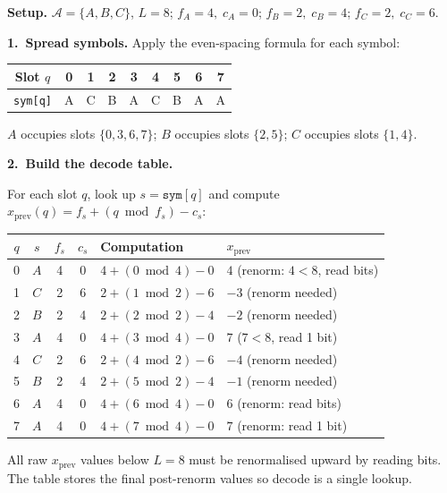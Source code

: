 \begin{examplebox}
\textbf{Setup.}
$\mathcal{A} = \{A, B, C\}$, $L = 8$;
$f_A = 4,\; c_A = 0$;\;
$f_B = 2,\; c_B = 4$;\;
$f_C = 2,\; c_C = 6$.

\medskip
\textbf{1.\ Spread symbols.}
Apply the even-spacing formula for each symbol:

\begin{center}
\begin{tabular}{@{}ccccccccc@{}}
\toprule
Slot $q$        & 0 & 1 & 2 & 3 & 4 & 5 & 6 & 7 \\
\midrule
\texttt{sym[q]} & A & C & B & A & C & B & A & A \\
\bottomrule
\end{tabular}
\end{center}

$A$ occupies slots $\{0,3,6,7\}$;\quad
$B$ occupies slots $\{2,5\}$;\quad
$C$ occupies slots $\{1,4\}$.

\medskip
\textbf{2.\ Build the decode table.}

For each slot $q$, look up $s = \texttt{sym}[q]$ and compute
$x_{\text{prev}}(q) = f_s + (q \bmod f_s) - c_s$:

\begin{center}
\begin{tabular}{@{}ccccll@{}}
\toprule
$q$ & $s$ & $f_s$ & $c_s$ & Computation & $x_{\text{prev}}$ \\
\midrule
0 & $A$ & 4 & 0 & $4+(0\bmod 4)-0$   & $4$ \quad (renorm: $4<8$, read bits) \\
1 & $C$ & 2 & 6 & $2+(1\bmod 2)-6$   & $-3$ \quad (renorm needed) \\
2 & $B$ & 2 & 4 & $2+(2\bmod 2)-4$   & $-2$ \quad (renorm needed) \\
3 & $A$ & 4 & 0 & $4+(3\bmod 4)-0$   & $7$ \quad ($7<8$, read 1 bit) \\
4 & $C$ & 2 & 6 & $2+(4\bmod 2)-6$   & $-4$ \quad (renorm needed) \\
5 & $B$ & 2 & 4 & $2+(5\bmod 2)-4$   & $-1$ \quad (renorm needed) \\
6 & $A$ & 4 & 0 & $4+(6\bmod 4)-0$   & $6$ \quad (renorm: read bits) \\
7 & $A$ & 4 & 0 & $4+(7\bmod 4)-0$   & $7$ \quad (renorm: read 1 bit) \\
\bottomrule
\end{tabular}
\end{center}

All raw $x_{\text{prev}}$ values below $L=8$ must be
renormalised upward by reading bits.  The table stores the
final post-renorm values so decode is a single lookup.


\end{examplebox}
